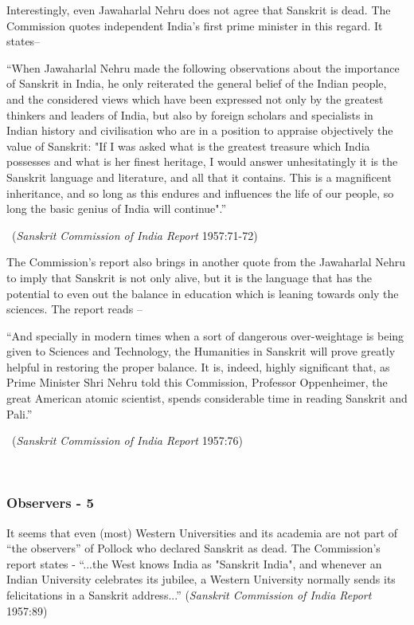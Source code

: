 Interestingly, even Jawaharlal Nehru does not agree that Sanskrit is dead. The Commission quotes independent India’s first prime minister in this regard. It states–
\begin{myquote}
\eleven
“When Jawaharlal Nehru made the following observations about the importance of Sanskrit in India, he only reiterated the general belief of the Indian people, and the considered views which have been expressed not only by the greatest thinkers and leaders of India, but also by foreign scholars and specialists in Indian history and civilisation who are in a position to appraise objectively the value of Sanskrit: "If I was asked what is the greatest treasure which India possesses and what is her finest heritage, I would answer unhesitatingly it is the Sanskrit language and literature, and all that it contains. This is a magnificent inheritance, and so long as this endures and influences the life of our people, so long the basic genius of India will continue".” 
\vskip -5pt

~\hfill({\sl Sanskrit Commission of India Report} 1957:71-72)
\end{myquote}

The Commission’s report also brings in another quote from the Jawaharlal Nehru to imply that Sanskrit is not only alive, but it is the language that has the potential to even out the balance in education which is leaning towards only the sciences. The report reads  – 
\begin{myquote}
\eleven
“And specially in modern times when a sort of dangerous over-weightage is being given to Sciences and Technology, the Humanities in Sanskrit will prove greatly helpful in restoring the proper balance. It is, indeed, highly significant that, as Prime Minister Shri Nehru told this Commission, Professor Oppenheimer, the great American atomic scientist, spends considerable time in reading Sanskrit and Pali.” 
\vskip -5pt

~\hfill({\sl Sanskrit Commission of India Report} 1957:76)
\end{myquote}

~\\[-45pt]

\subsubsection{Observers - 5}
\vskip -3pt

It seems that even (most) Western Universities and its academia are not part of “the observers” of Pollock who declared Sanskrit as dead. The Commission’s report states  - “...the West knows India as "Sanskrit India", and whenever an Indian University celebrates its jubilee, a Western University normally sends its felicitations in a Sanskrit address...” ({\sl Sanskrit Commission of India Report} 1957:89)

